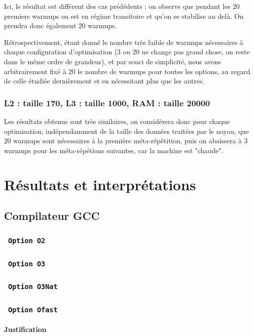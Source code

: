 \documentclass{report}
\begin{document}
	Ici, le résultat est différent des cas prédédents : on observe que pendant les 20 premiers warmups on est en régime transitoire et qu'on se stabilise au delà. On prendra donc également 20 warmups.
	
	Rétrospectivement, étant donné le nombre très faible de warmups nécessaires à chaque configuration d'optimisation (3 ou 20 ne change pas grand chose, on reste dans le même ordre de grandeur), et par souci de simplicité, nous avons arbitrairement fixé à 20 le nombre de warmups pour toutes les options, au regard de celle étudiée dernièrement et en nécessitant plus que les autres.
  
    \subsubsection{L2 : taille 170, L3 : taille 1000, RAM : taille 20000}
    Les résultats obtenus sont très similaires, on considèrera donc pour chaque optimisation, indépendamment de la taille des données traitées par le noyau, que 20 warmups sont nécessaires à la première méta-répétition, puis on abaissera à 3 warmups pour les méta-répétions suivantes, car la machine est "chaude".
    
\section{Résultats et interprétations}
    \subsection{Compilateur GCC}
      \subsubsection{ \texttt{ Option O2 } }
     
      \subsubsection{ \texttt{ Option O3 }  }
      \subsubsection{ \texttt{ Option O3Nat} }
      \subsubsection{ \texttt{ Option Ofast } }
	      \paragraph{Justification}
	      
\end{document}
